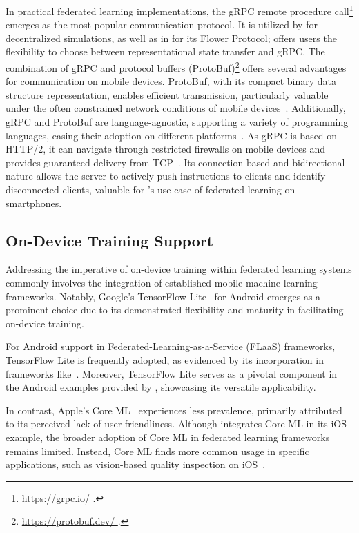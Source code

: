 In practical federated learning implementations,
the gRPC remote procedure call\footnote{\url{
        https://grpc.io/
    }.} emerges as the most popular communication protocol.
It is utilized by \cite{tff,patrick2022openfl} for decentralized simulations,
as well as in \cite{beutel2020flower} for its Flower Protocol;
\cite{madrigal2023project}
offers users the flexibility to choose between representational state transfer
and gRPC. The combination of gRPC and protocol buffers (ProtoBuf)\footnote{\url{
        https://protobuf.dev/
    }.} offers several advantages for communication on mobile devices. ProtoBuf,
with its compact binary data structure representation,
enables efficient transmission,
particularly valuable under the often constrained network conditions of mobile
devices~\cite{popic2016performance}. Additionally,
gRPC and ProtoBuf are language-agnostic,
supporting a variety of programming languages,
easing their adoption on different platforms~\cite{araujo2020performance}.
As gRPC is based on HTTP/2,
it can navigate through restricted firewalls on mobile devices and provides
guaranteed delivery from TCP~\cite{araujo2020performance}.
Its connection-based and bidirectional nature allows the server to actively push
instructions to clients and identify disconnected clients,
valuable for \fedcampus's use case of federated learning on smartphones.

\subsection{On-Device Training Support}

Addressing the imperative of on-device training within federated learning
systems commonly involves the integration of established mobile machine learning
frameworks. Notably,
Google's TensorFlow Lite~\cite{tensorflow2015-whitepaper,abadi2016tensorflow}
for Android emerges as a prominent choice due to its demonstrated flexibility
and maturity in facilitating on-device training.

For Android support in Federated-Learning-as-a-Service (FLaaS) frameworks,
TensorFlow Lite is frequently adopted,
as evidenced by its incorporation in frameworks
like~\cite{kourtellis2020flaas,katevas2022flaas}. Moreover,
TensorFlow Lite serves as a pivotal component in the Android examples provided
by \cite{mathur2021ondevice}, showcasing its versatile applicability.

In contrast, Apple's Core ML~\cite{coreml} experiences less prevalence,
primarily attributed to its perceived lack of user-friendliness.
Although \cite{beutel2020flower} integrates Core ML in its iOS example,
the broader adoption of Core ML in federated learning frameworks remains
limited. Instead, Core ML finds more common usage in specific applications,
such as vision-based quality inspection on iOS~\cite{bharti2022edge}.

